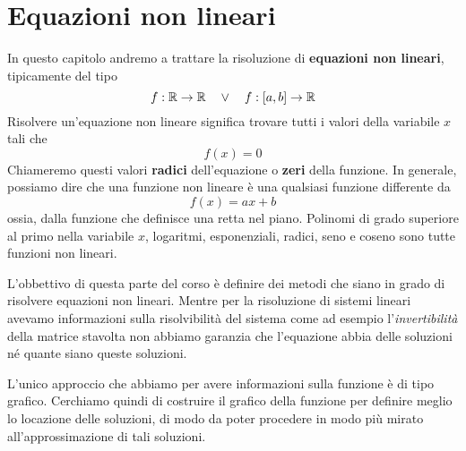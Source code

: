 \chapter{Equazioni non lineari}
In questo capitolo andremo a trattare la risoluzione di \textbf{equazioni non lineari}, tipicamente del tipo
\[ f : \mathbb{R} \to \mathbb{R} \quad \vee \quad f : [a, b] \to \mathbb{R} \]
Risolvere un'equazione non lineare significa trovare tutti i valori della variabile $x$ tali che
\[ f(x) = 0 \]
Chiameremo questi valori \textbf{radici} dell'equazione o \textbf{zeri} della funzione. In generale, possiamo
dire che una funzione non lineare è una qualsiasi funzione differente da
\[ f(x) = a x + b \]
ossia, dalla funzione che definisce una retta nel piano. Polinomi di grado superiore al primo nella variabile
$x$, logaritmi, esponenziali, radici, seno e coseno sono tutte funzioni non lineari.

L'obbettivo di questa parte del corso è definire dei metodi che siano in grado di risolvere equazioni non
lineari. Mentre per la risoluzione di sistemi lineari avevamo informazioni sulla risolvibilità del sistema
come ad esempio l'\emph{invertibilità} della matrice stavolta non abbiamo garanzia che l'equazione abbia
delle soluzioni né quante siano queste soluzioni.

L'unico approccio che abbiamo per avere informazioni sulla funzione è di tipo grafico. Cerchiamo quindi di
costruire il grafico della funzione per definire meglio lo locazione delle soluzioni, di modo da poter procedere
in modo più mirato all'approssimazione di tali soluzioni.



